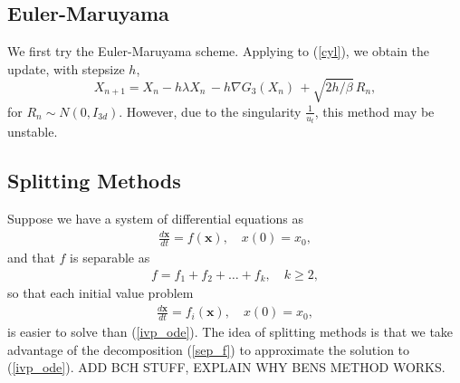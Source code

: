 \documentclass{article}
\renewcommand{\vec}[1]{{\mathbf{#1}}}
\begin{document}
\subsection{Euler-Maruyama}
We first try the Euler-Maruyama scheme. Applying to (\ref{cyl}), we obtain the update, with stepsize $h$,
\[X_{n+1} = X_n - h\lambda X_n \, - h\nabla G_{3}(X_n)\, + \sqrt{2h/\beta}\,R_n,\]
for $R_n \sim N(0,I_{3d})$. However, due to the singularity $\frac{1}{u_t}$, this method may be unstable.

\subsection{Splitting Methods}
Suppose we have a system of differential equations as
\begin{equation}  
 \begin{aligned}
  \frac{d\vec x}{dt} = f(\vec x), \quad  x(0) = x_0,
  \end{aligned}\label{ivp_ode}
\end{equation}
and that $f$ is separable as 
\begin{equation}  
 \begin{aligned}
  f = f_1 + f_2 + \hdots + f_k, \quad k \geq 2,
  \end{aligned}\label{sep_f}
\end{equation}
so that each initial value problem 
\begin{equation}  
 \begin{aligned}
  \frac{d\vec x}{dt} = f_i(\vec x), \quad  x(0) = x_0,
  \end{aligned}\label{ivp_ode_small}
\end{equation}
is easier to solve than (\ref{ivp_ode}). The idea of splitting methods is that we take advantage of the decomposition (\ref{sep_f}) to approximate the solution to (\ref{ivp_ode}). ADD BCH STUFF, EXPLAIN WHY BENS METHOD WORKS.

\end{document}
